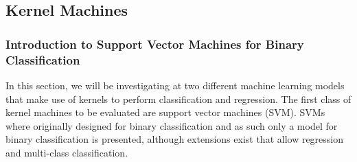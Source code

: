 \subsection{Kernel Machines}\label{Section1.4}

\subsubsection{Introduction to Support Vector Machines for Binary Classification}\label{Section1.4.1}
In this section, we will be investigating at two different machine learning models that make use of kernels to perform classification and regression. The first class of kernel machines to be evaluated are support vector machines (SVM). SVMs where originally designed for binary classification and as such only a model for binary classification is presented, although extensions exist that allow regression and multi-class classification.

